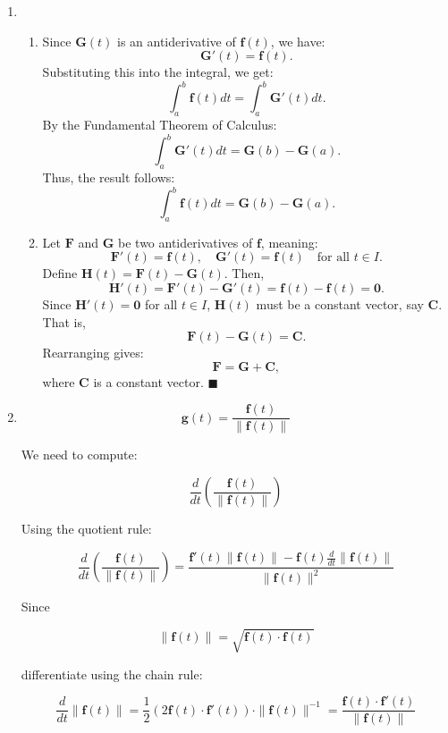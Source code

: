 \documentclass[12pt]{article}
\newcommand{\qed}[0]{$\blacksquare$}
\begin{document}
\begin{enumerate}
\item 
\begin{enumerate}
    \item

    Since \( \mathbf{G}(t) \) is an antiderivative of \( \mathbf{f}(t) \), we have:
    \[
    \mathbf{G}'(t) = \mathbf{f}(t).
    \]
    Substituting this into the integral, we get:
    \[
    \int_a^b \mathbf{f}(t) dt = \int_a^b \mathbf{G}'(t) dt.
    \]
    By the Fundamental Theorem of Calculus:
    \[
    \int_a^b \mathbf{G}'(t) dt = \mathbf{G}(b) - \mathbf{G}(a).
    \]
    Thus, the result follows:
    \[
    \int_a^b \mathbf{f}(t) dt = \mathbf{G}(b) - \mathbf{G}(a).
    \]

    \item 

    Let \( \mathbf{F} \) and \( \mathbf{G} \) be two antiderivatives of \( \mathbf{f} \), meaning:
    \[
    \mathbf{F}'(t) = \mathbf{f}(t), \quad \mathbf{G}'(t) = \mathbf{f}(t) \quad \text{for all } t \in I.
    \]
    Define \( \mathbf{H}(t) = \mathbf{F}(t) - \mathbf{G}(t) \). Then,
    \[
    \mathbf{H}'(t) = \mathbf{F}'(t) - \mathbf{G}'(t) = \mathbf{f}(t) - \mathbf{f}(t) = \mathbf{0}.
    \]
    Since \( \mathbf{H}'(t) = \mathbf{0} \) for all \( t \in I \), \( \mathbf{H}(t) \) must be a constant vector, say \( \mathbf{C} \). That is,
    \[
    \mathbf{F}(t) - \mathbf{G}(t) = \mathbf{C}.
    \]
    Rearranging gives:
    \[
    \mathbf{F} = \mathbf{G} + \mathbf{C},
    \]
    where \( \mathbf{C} \) is a constant vector. \qed
\end{enumerate}
\item 
\[
\mathbf{g}(t) = \frac{\mathbf{f}(t)}{\|\mathbf{f}(t)\|}
\]

We need to compute:

\[
\frac{d}{dt} \left( \frac{\mathbf{f}(t)}{\|\mathbf{f}(t)\|} \right)
\]

Using the quotient rule:

\[
\frac{d}{dt} \left( \frac{\mathbf{f}(t)}{\|\mathbf{f}(t)\|} \right) =
\frac{\mathbf{f}'(t) \|\mathbf{f}(t)\| - \mathbf{f}(t) \frac{d}{dt} \|\mathbf{f}(t)\|}{\|\mathbf{f}(t)\|^2}
\]

Since 

\[
\|\mathbf{f}(t)\| = \sqrt{\mathbf{f}(t) \cdot \mathbf{f}(t)}
\]

differentiate using the chain rule:

\[
\frac{d}{dt} \|\mathbf{f}(t)\| = \frac{1}{2} (2 \mathbf{f}(t) \cdot \mathbf{f}'(t)) \cdot \|\mathbf{f}(t)\|^{-1}
= \frac{\mathbf{f}(t) \cdot \mathbf{f}'(t)}{\|\mathbf{f}(t)\|}
\]


\end{enumerate}
\end{document}
